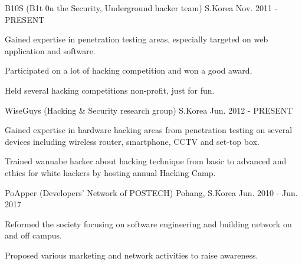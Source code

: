 

\begin{cventries}

	{B10S (B1t 0n the Security, Underground hacker team)} %
	{S.Korea} %
	{Nov. 2011 - PRESENT} %
	{
		\begin{cvitems} %
			\item {Gained expertise in penetration testing areas, especially targeted on web application and software.}
			\item {Participated on a lot of hacking competition and won a good award.}
			\item {Held several hacking competitions non-profit, just for fun.}
		\end{cvitems}
	}

	{WiseGuys (Hacking \& Security research group)} %
	{S.Korea} %
	{Jun. 2012 - PRESENT} %
	{
		\begin{cvitems} %
			\item {Gained expertise in hardware hacking areas from penetration testing on several devices including wireless router, smartphone, CCTV and set-top box.}
			\item {Trained wannabe hacker about hacking technique from basic to advanced and ethics for white hackers by hosting annual Hacking Camp.}
		\end{cvitems}
	}

	{PoApper (Developers' Network of POSTECH)} %
	{Pohang, S.Korea} %
	{Jun. 2010 - Jun. 2017} %
	{
		\begin{cvitems} %
			\item {Reformed the society focusing on software engineering and building network on and off campus.}
			\item {Proposed various marketing and network activities to raise awareness.}
		\end{cvitems}
	}


\end{cventries}
